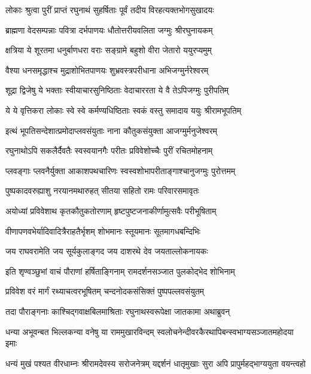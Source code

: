 \twolineshloka
{लोकाः श्रुत्वा पुरीं प्राप्तं रघुनाथं सुहर्षिताः}
{पूर्वं तदीय विरहत्यक्तभोगसुखादयः}%

\twolineshloka
{ब्राह्मणा वेदसम्पन्नाः पवित्रा दर्भपाणयः}
{धौतोत्तरीयवलिता जग्मुः श्रीरघुनायकम्}%

\twolineshloka
{क्षत्रिया ये शूरतमा धनुर्बाणधरा वराः}
{सङ्ग्रामे बहुशो वीरा जेतारो ययुरप्यमुम्}%

\twolineshloka
{वैश्या धनसमृद्धाश्च मुद्राशोभितपाणयः}
{शुभ्रवस्त्रपरीधाना अभिजग्मुर्नरेश्वरम्}%

\twolineshloka
{शूद्रा द्विजेषु ये भक्ताः स्वीयाचारसुनिष्ठिताः}
{वेदाचाररता ये वै तेऽपिजग्मुः पुरीपतिम्}%

\twolineshloka
{ये ये वृत्तिकरा लोकाः स्वे स्वे कर्मण्यधिष्ठिताः}
{स्वकं वस्तु समादाय ययुः श्रीरामभूपतिम्}%

\twolineshloka
{इत्थं भूपतिसन्देशात्प्रमोदाप्लवसंयुताः}
{नाना कौतुकसंयुक्ता आजग्मुर्मनुजेश्वरम्}%


\twolineshloka
{रघुनाथोऽपि सकलैर्दैवतैः स्वस्वयानगैः}
{परीतः प्रविवेशोच्चैः पुरीं रचितमोहनाम्}%

\twolineshloka
{प्लवङ्गाः प्लवनैर्युक्ता आकाशपथचारिणः}
{स्वस्वशोभापरीताङ्गाश्चानुजग्मुः पुरोत्तमम्}%

\twolineshloka
{पुष्पकादवरुह्याशु नरयानमथारुहत्}
{सीतया सहितो रामः परिवारसमावृतः}%

\twolineshloka
{अयोध्यां प्रविवेशाथ कृतकौतुकतोरणाम्}
{हृष्टपुष्टजनाकीर्णामुत्सवैः परीभूषिताम्}%

\twolineshloka
{वीणापणवभेर्यादिवादित्रैराहतैर्भृशम्}
{शोभमानः स्तूयमानः सूतमागधबन्दिभिः}%

\twolineshloka
{जय राघवरामेति जय सूर्यकुलाङ्गद}
{जय दाशरथे देव जयताल्लोकनायकः}%

\twolineshloka
{इति शृण्वञ्छुभां वाचं पौराणां हर्षिताङ्गिनाम्}
{रामदर्शनसञ्जात पुलकोद्भेद शोभिनाम्}%

\twolineshloka
{प्रविवेश वरं मार्गं रथ्याचत्वरभूषितम्}
{चन्दनोदकसंसिक्तं पुष्पपल्लवसंयुतम्}%

\twolineshloka
{तदा पौराङ्गनाः काश्चिद्गवाक्षबिलमाश्रिताः}
{रघुनाथस्वरूपेक्षा जातकामा अथाब्रुवन्}%


\twolineshloka
{धन्या अभूवन्बत भिल्लकन्या वनेषु या राममुखारविन्दम्}
{स्वलोचनेन्दीवरकैरथापिबन्स्वभाग्यसञ्जातमहोदया इमाः}%

\twolineshloka
{धन्यं मुखं पश्यत वीरधाम्नः श्रीरामदेवस्य सरोजनेत्रम्}
{यद्दर्शनं धातृमुखाः सुरा अपि प्रापुर्महद्भाग्ययुता वयन्त्वहो}%

